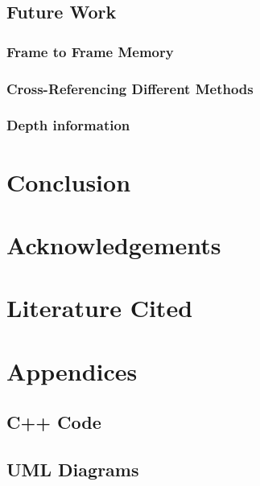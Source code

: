 \documentclass[a4paper,10pt]{article}
\begin{document}
  \subsection{Future Work}
    \subsubsection{Frame to Frame Memory}

    \subsubsection{Cross-Referencing Different Methods}

    \subsubsection{Depth information}

  
\section{Conclusion}
\section{Acknowledgements}
\section{Literature Cited}
  
  
\section{Appendices}
  \subsection{C++ Code}
  \subsection{UML Diagrams}
\end{document}
